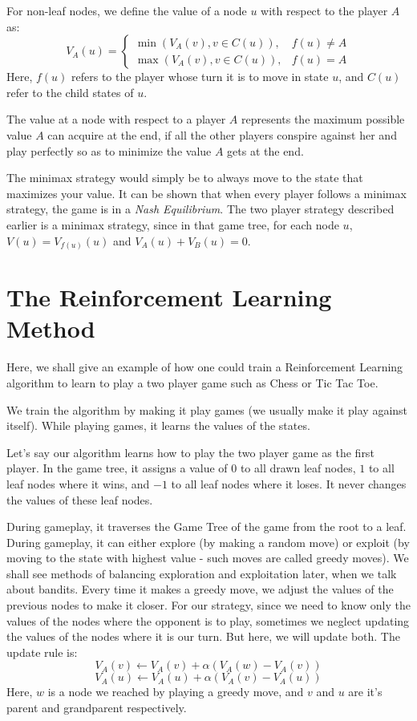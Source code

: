 \documentclass[12pt]{report}
\begin{document}
For non-leaf nodes, we define the value of a node $u$ with respect to the player $A$ as:
\begin{equation}
    V_{A}(u) = \begin{cases}
        \min(V_{A}(v),  v \in C(u)), & f(u) \neq A\\
        \max(V_{A}(v), v \in C(u)), & f(u) = A
    \end{cases}
\end{equation}
Here, $f(u)$ refers to the player whose turn it is to move in state $u$, and $C(u)$ refer to the child states of $u$.

The value at a node with respect to a player $A$ represents the maximum possible value $A$ can acquire at the end, if all the other players conspire against her and play perfectly so as to minimize the value $A$ gets at the end.

The minimax strategy would simply be to always move to the state that maximizes your value. It can be shown that when every player follows a minimax strategy, the game is in a \textit{Nash Equilibrium}. The two player strategy described earlier 
is a minimax strategy, since in that game tree, for each node $u$, $V(u) = V_{f(u)}(u)$ and $V_{A}(u) + V_{B}(u) = 0$.

\section{The Reinforcement Learning Method}
Here, we shall give an example of how one could train a Reinforcement Learning algorithm to learn to play a two player game such as Chess or Tic Tac Toe.

We train the algorithm by making it play games (we usually make it play against itself). While playing games, it learns the values of the states. 

Let's say our algorithm learns how to play the two player game as the first player. In the game tree, it assigns a value of $0$ to all drawn leaf nodes, $1$ to all leaf nodes where it wins,
and $-1$ to all leaf nodes where it loses. It never changes the values of these leaf nodes.

During gameplay, it traverses the Game Tree of the game from the root to a leaf. During gameplay, it can either explore (by making a random move) or exploit (by moving to the state with highest value - such moves are called greedy moves).
We shall see methods of balancing exploration and exploitation later, when we talk about bandits.
Every time it makes a greedy move, we adjust the values of the previous nodes to make it closer. For our strategy, since we need to know only the values of the nodes where the opponent is to play, sometimes we neglect updating the values of the nodes where it is our turn.
But here, we will update both. The update rule is:
\begin{equation}
    V_{A}(v) \leftarrow V_{A}(v) + \alpha(V_{A}(w) - V_{A}(v))
\end{equation}
\begin{equation}
    V_{A}(u) \leftarrow V_{A}(u) + \alpha(V_{A}(v) - V_{A}(u))
\end{equation}
Here, $w$ is a node we reached by playing a greedy move, and $v$ and $u$ are it's parent and grandparent respectively.
\end{document}
